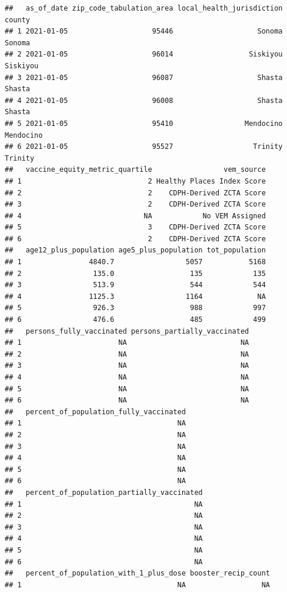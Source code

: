 \documentclass[
]{article}
\begin{document}
\begin{verbatim}
##   as_of_date zip_code_tabulation_area local_health_jurisdiction    county
## 1 2021-01-05                    95446                    Sonoma    Sonoma
## 2 2021-01-05                    96014                  Siskiyou  Siskiyou
## 3 2021-01-05                    96087                    Shasta    Shasta
## 4 2021-01-05                    96008                    Shasta    Shasta
## 5 2021-01-05                    95410                 Mendocino Mendocino
## 6 2021-01-05                    95527                   Trinity   Trinity
##   vaccine_equity_metric_quartile                 vem_source
## 1                              2 Healthy Places Index Score
## 2                              2    CDPH-Derived ZCTA Score
## 3                              2    CDPH-Derived ZCTA Score
## 4                             NA            No VEM Assigned
## 5                              3    CDPH-Derived ZCTA Score
## 6                              2    CDPH-Derived ZCTA Score
##   age12_plus_population age5_plus_population tot_population
## 1                4840.7                 5057           5168
## 2                 135.0                  135            135
## 3                 513.9                  544            544
## 4                1125.3                 1164             NA
## 5                 926.3                  988            997
## 6                 476.6                  485            499
##   persons_fully_vaccinated persons_partially_vaccinated
## 1                       NA                           NA
## 2                       NA                           NA
## 3                       NA                           NA
## 4                       NA                           NA
## 5                       NA                           NA
## 6                       NA                           NA
##   percent_of_population_fully_vaccinated
## 1                                     NA
## 2                                     NA
## 3                                     NA
## 4                                     NA
## 5                                     NA
## 6                                     NA
##   percent_of_population_partially_vaccinated
## 1                                         NA
## 2                                         NA
## 3                                         NA
## 4                                         NA
## 5                                         NA
## 6                                         NA
##   percent_of_population_with_1_plus_dose booster_recip_count
## 1                                     NA                  NA

\end{verbatim}
\end{document}
